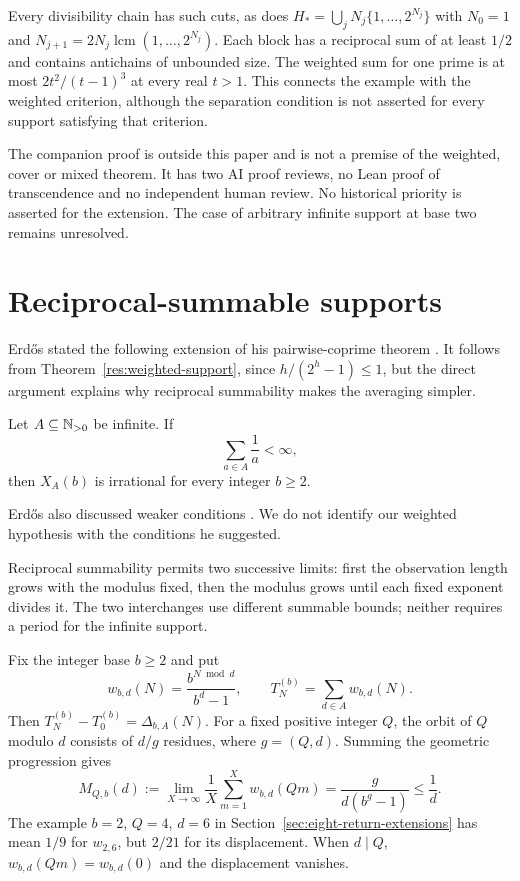 \documentclass[11pt]{article}
\begin{document}
Every divisibility chain has such cuts, as does
$H_* = \bigcup_j N_j\{1,\ldots,2^{N_j}\}$ with $N_0=1$ and
$N_{j+1}=2N_j\operatorname{lcm}(1,\ldots,2^{N_j})$.
Each block has a reciprocal sum of at least $1/2$ and contains
antichains of unbounded size. The weighted sum for one prime is at
most $2t^2/(t-1)^3$ at every real $t>1$. This connects the example
with the weighted criterion, although the separation condition is
not asserted for every support satisfying that criterion.

The companion proof is outside this paper and is not a premise of the
weighted, cover or mixed theorem. It has two AI proof reviews, no Lean
proof of transcendence and no independent human review. No historical
priority is asserted for the extension. The case of arbitrary infinite
support at base two remains unresolved.

\appendix
\section{Reciprocal-summable supports}\label{sec:reciprocal-support}
Erd\H{o}s stated the following extension of his pairwise-coprime theorem
\cite[p.~222]{erdos1968}. It follows from
Theorem~\ref{res:weighted-support}, since $h/(2^h-1)\le1$, but the
direct argument explains why reciprocal summability makes the averaging
simpler.

\begin{theorem}\label{res:reciprocal-support}
Let $A\subseteq\mathbb{N}_{>0}$ be infinite.  If
\[
  \sum_{a\in A}\frac1a<\infty,
\]
then \(X_A(b)\) is irrational for every integer \(b\ge2\).
\end{theorem}

Erd\H{o}s also discussed weaker conditions \cite[pp.~222, 226]{erdos1968}.
We do not identify our weighted hypothesis with the conditions he suggested.

Reciprocal summability permits two successive limits: first the
observation length grows with the modulus fixed, then the modulus
grows until each fixed exponent divides it. The two interchanges use
different summable bounds; neither requires a period for the infinite
support.

Fix the integer base $b\ge2$ and put
\[
 w_{b,d}(N)=\frac{b^{N\bmod d}}{b^d-1},\qquad
 T_N^{(b)}=\sum_{d\in A}w_{b,d}(N).
\]
Then $T_N^{(b)}-T_0^{(b)}=\Delta_{b,A}(N)$.
For a fixed positive integer $Q$, the orbit of $Q$ modulo $d$ consists of
$d/g$ residues, where $g=(Q,d)$.  Summing the geometric progression gives
\begin{equation}
 M_{Q,b}(d):=\lim_{X\to\infty}\frac1X\sum_{m=1}^Xw_{b,d}(Qm)
 =\frac{g}{d(b^g-1)}\le\frac1d.
 \label{eq:gcd-orbit-mean}
\end{equation}
The example $b=2$, $Q=4$, $d=6$ in
Section~\ref{sec:eight-return-extensions} has mean $1/9$ for $w_{2,6}$,
but $2/21$ for its displacement. When $d\mid Q$,
$w_{b,d}(Qm)=w_{b,d}(0)$ and the displacement vanishes.
\end{document}
